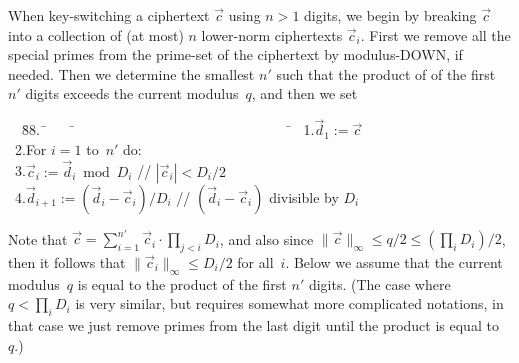 \documentclass[14pt]{extarticle}
\def\vc{\vec{c}}
\def\vd{\vec{d}}
\begin{document}
When key-switching a ciphertext $\vc$ using $n>1$ digits, we begin by
breaking $\vc$ into a collection of (at most) $n$ lower-norm ciphertexts
$\vc_i$. First we remove all the special primes from the prime-set of
the ciphertext by modulus-DOWN, if needed. Then we determine the
smallest $n'$ such that the product of of the first $n'$ digits
exceeds the current modulus~$q$, and then we set
\begin{tabbing}
~~\=88.~\=~~~~\=~~~~~~~~~~~~~~~~~~~~~~~~~~~~~~~\=\kill
\>~1.\>$\vd_1 := \vc$\\
\>~2.\>For $i=1$ to~$n'$ do:\\
\>~3.\>\>$\vc_i :=\vd_i\bmod D_i$ 
     \>// $|\vc_i|<D_i/2$ \\
\>~4.\>\>$\vd_{i+1} := (\vd_i-\vc_i)/D_i$
     \>// $(\vd_i-\vc_i)$ divisible by $D_i$ %
\end{tabbing}
Note that $\vc=\sum_{i=1}^{n'}\vc_i \cdot\prod_{j<i}D_i$, and also
since $\|\vc\|_{\infty} \le q/2\le(\prod_i D_i)/2$, then it follows
that $\|\vc_i\|_{\infty}\le D_i/2$ for all~$i$. Below we assume that
the current modulus~$q$ is equal to the product of the first $n'$
digits. (The case where $q<\prod_i D_i$ is very similar, but requires
somewhat more complicated notations, in that case we just remove
primes from the last digit until the product is equal to~$q$.)
\end{document}
